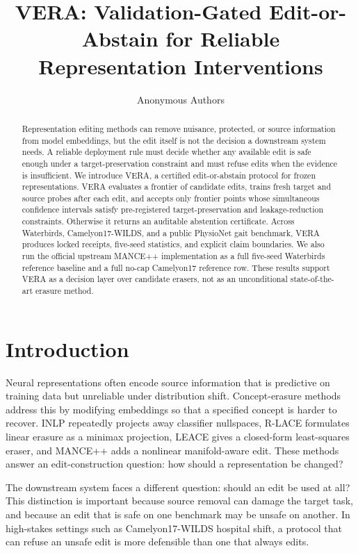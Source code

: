 \documentclass[10pt,twocolumn]{article}
\title{VERA: Validation-Gated Edit-or-Abstain for Reliable Representation Interventions}
\author{Anonymous Authors}
\date{}
\begin{document}
\sloppy
{}
\maketitle

\begin{abstract}
Representation editing methods can remove nuisance, protected, or source
information from model embeddings, but the edit itself is not the decision a
downstream system needs. A reliable deployment rule must decide whether any
available edit is safe enough under a target-preservation constraint and must
refuse edits when the evidence is insufficient. We introduce VERA, a certified
edit-or-abstain protocol for frozen representations. VERA evaluates a frontier
of candidate edits, trains fresh target and source probes after each edit, and
accepts only frontier points whose simultaneous confidence intervals satisfy
pre-registered target-preservation and leakage-reduction constraints. Otherwise
it returns an auditable abstention certificate. Across Waterbirds,
Camelyon17-WILDS, and a public PhysioNet gait benchmark, VERA produces locked
receipts, five-seed statistics, and explicit claim boundaries. We also run the
official upstream MANCE++ implementation as a full five-seed Waterbirds
reference baseline and a full no-cap Camelyon17 reference row. These results
support VERA as a decision layer over candidate erasers, not as an
unconditional state-of-the-art erasure method.
\end{abstract}

\section{Introduction}

Neural representations often encode source information that is predictive on
training data but unreliable under distribution shift. Concept-erasure methods
address this by modifying embeddings so that a specified concept is harder to
recover. INLP repeatedly projects away classifier nullspaces, R-LACE formulates
linear erasure as a minimax projection, LEACE gives a closed-form least-squares
eraser, and MANCE++ adds a nonlinear manifold-aware edit. These methods answer
an edit-construction question: how should a representation be changed?

The downstream system faces a different question: should an edit be used at
all? This distinction is important because source removal can damage the
target task, and because an edit that is safe on one benchmark may be unsafe on
another. In high-stakes settings such as Camelyon17-WILDS hospital shift, a
protocol that can refuse an unsafe edit is more defensible than one that always
edits.
\end{document}
